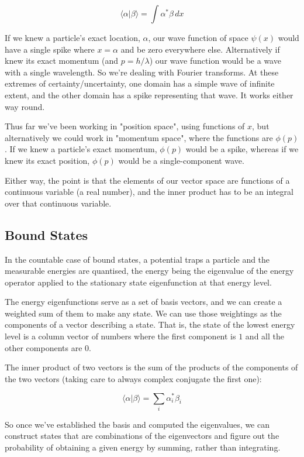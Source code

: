 $$
\langle \alpha | \beta \rangle
=
\int
\alpha^* \beta \,dx
$$

If we knew a particle's exact location, $\alpha$, our wave function of space $\psi(x)$ would have a single spike where $x = \alpha$ and be zero everywhere else. Alternatively if knew its exact momentum (and $p=h/\lambda$) our wave function would be a wave with a single wavelength. So we're dealing with Fourier transforms. At these extremes of certainty/uncertainty, one domain has a simple wave of infinite extent, and the other domain has a spike representing that wave. It works either way round.

Thus far we've been working in "position space", using functions of $x$, but alternatively we could work in "momentum space", where the functions are $\phi(p)$. If we knew a particle's exact momentum, $\phi(p)$ would be a spike, whereas if we knew its exact position, $\phi(p)$ would be a single-component wave.

Either way, the point is that the elements of our vector space are functions of a continuous variable (a real number), and the inner product has to be an integral over that continuous variable.

\subsection{Bound States}

In the countable case of bound states, a potential traps a particle and the measurable energies are quantised, the energy being the eigenvalue of the energy operator applied to the stationary state eigenfunction at that energy level.

The energy eigenfunctions serve as a set of basis vectors, and we can create a weighted sum of them to make any state. We can use those weightings as the components of a vector describing a state. That is, the state of the lowest energy level is a column vector of numbers where the first component is $1$ and all the other components are $0$.

The inner product of two vectors is the sum of the products of the components of the two vectors (taking care to always complex conjugate the first one):

$$
\langle \alpha | \beta \rangle
=
\sum_i
\alpha_i^* \beta_i
$$

So once we've established the basis and computed the eigenvalues, we can construct states that are combinations of the eigenvectors and figure out the probability of obtaining a given energy by summing, rather than integrating.

